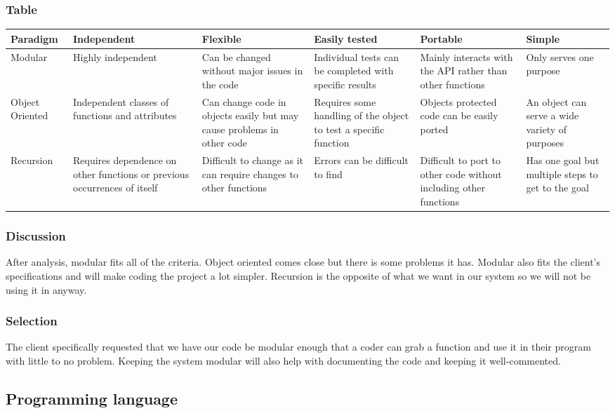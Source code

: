\documentclass[10pt,letterpaper,onecolumn,draftclsnofoot]{IEEEtran}
\begin{document}
\subsubsection{Table}
\begin{center}
\begin{tabular}{ ||B|M|M|M|M|M|| } 
\hline
Paradigm & Independent & Flexible & Easily tested & Portable & Simple \\
 \hline
 Modular & Highly independent & Can be changed without major issues in the code & Individual tests can be completed with specific results & Mainly interacts with the API rather than other functions & Only serves one purpose\\ 
 \hline
 Object Oriented & Independent classes of functions and attributes & Can change code in objects easily but may cause problems in other code & Requires some handling of the object to test a specific function & Objects protected code can be easily ported & An object can serve a wide variety of purposes\\ 
 \hline
 Recursion & Requires dependence on other functions or previous occurrences of itself & Difficult to change as it can require changes to other functions & Errors can be difficult to find  & Difficult to port to other code without including other functions & Has one goal but multiple steps to get to the goal\\ 
 \hline
\end{tabular}
\end{center}

\subsubsection{Discussion}
After analysis, modular fits all of the criteria. Object oriented comes close but there is some problems it has. Modular also fits the client's specifications and will make coding the project a lot simpler. Recursion is the opposite of what we want in our system so we will not be using it in anyway.

\subsubsection{Selection}
The client specifically requested that we have our code be modular enough that a coder can grab a function and use it in their program with little to no problem. Keeping the system modular will also help with documenting the code and keeping it well-commented.

\subsection{Programming language}
\end{document}
